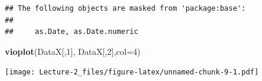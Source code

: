 \documentclass[
]{article}
\newenvironment{Shaded}{\begin{snugshade}}{\end{snugshade}}
\newcommand{\DataTypeTok}[1]{\textcolor[rgb]{0.13,0.29,0.53}{#1}}
\newcommand{\DecValTok}[1]{\textcolor[rgb]{0.00,0.00,0.81}{#1}}
\newcommand{\KeywordTok}[1]{\textcolor[rgb]{0.13,0.29,0.53}{\textbf{#1}}}
\newcommand{\NormalTok}[1]{#1}
\begin{document}
\begin{verbatim}
## The following objects are masked from 'package:base':
## 
##     as.Date, as.Date.numeric
\end{verbatim}

\begin{Shaded}
\begin{Highlighting}[]
\KeywordTok{vioplot}\NormalTok{(DataX[,}\DecValTok{1}\NormalTok{], DataX[,}\DecValTok{2}\NormalTok{],}\DataTypeTok{col=}\DecValTok{4}\NormalTok{)}
\end{Highlighting}
\end{Shaded}

\texttt{[image: Lecture-2\_files/figure-latex/unnamed-chunk-9-1.pdf]}
\end{document}
